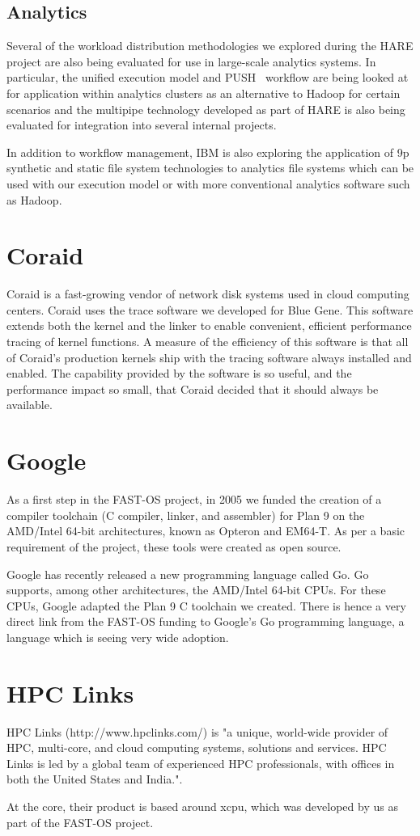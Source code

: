\subsection{Analytics}

Several of the workload distribution methodologies we explored 
during the HARE project are also being evaluated for use in large-scale
analytics systems.  In particular, the unified execution model and PUSH~\cite{PUSH}
workflow are being looked at for application within analytics clusters as an alternative to
Hadoop for certain scenarios and the multipipe technology developed as part of HARE is
also being evaluated for integration into several internal projects.

In addition to workflow management, IBM is also exploring the application of
9p synthetic and static file system technologies to analytics file systems which
can be used with our execution model or with more conventional analytics software
such as Hadoop. 

\section{Coraid}
Coraid is a fast-growing vendor of network disk systems used in cloud computing centers. 
Coraid uses the trace software we developed\cite{plan9trace} for Blue Gene. 
This software extends both the kernel and the linker to enable convenient, efficient 
performance tracing of kernel functions. A measure of the efficiency of this software 
is that  all of Coraid's production
kernels ship with the tracing software always installed and enabled. 
The capability provided by the software is so useful, and the performance impact so small, 
that Coraid decided that it should always be available. 

\section{Google}
As a first step in the FAST-OS project, in 2005 we 
funded the creation of  a compiler toolchain (C compiler, linker, and assembler) for Plan 9 on the 
AMD/Intel 64-bit architectures, known as Opteron and EM64-T.
As per a basic requirement of the project, these
tools were created as open source. 

Google has recently released a new programming language called Go. Go supports, among other 
architectures, the AMD/Intel 64-bit CPUs. For these CPUs, Google adapted the  Plan 9 C toolchain
we created. There is hence a very direct link from the FAST-OS funding to Google's Go programming 
language, a language which is seeing very wide adoption. 

\section{HPC Links}
HPC Links (http://www.hpclinks.com/) is 
"a unique, world-wide provider of HPC, multi-core, and cloud computing systems,
solutions and services. HPC Links is led by a global team of experienced HPC professionals, with
offices in both the United States and India.". 

At the core, their product is based around xcpu, which was developed by 
us as part of the FAST-OS project.

